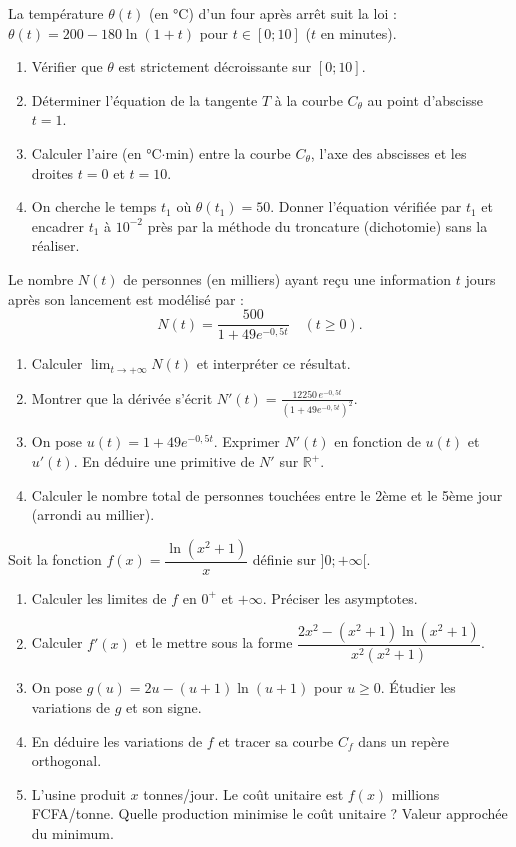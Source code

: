 \documentclass[11pt]{article}
\begin{document}
\begin{exercice}
La température $\theta(t)$ (en °C) d'un four après arrêt suit la loi : $\theta(t) = 200 - 180\ln(1+t)$ pour $t \in [0 ; 10]$ ($t$ en minutes).
\begin{enumerate}
    \item Vérifier que $\theta$ est strictement décroissante sur $[0 ; 10]$.
    \item Déterminer l'équation de la tangente $T$ à la courbe $C_\theta$ au point d'abscisse $t=1$.
    \item Calculer l'aire (en °C$\cdot$min) entre la courbe $C_\theta$, l'axe des abscisses et les droites $t=0$ et $t=10$. 
    \item On cherche le temps $t_1$ où $\theta(t_1) = 50$. Donner l'équation vérifiée par $t_1$ et encadrer $t_1$ à $10^{-2}$ près par la méthode du troncature (dichotomie) sans la réaliser.
\end{enumerate}
\end{exercice}

\begin{exercice}
Le nombre $N(t)$ de personnes (en milliers) ayant reçu une information $t$ jours après son lancement est modélisé par :
$$N(t) = \frac{500}{1 + 49e^{-0,5t}} \quad (t \geq 0).$$
\begin{enumerate}
    \item Calculer $\lim_{t\to+\infty} N(t)$ et interpréter ce résultat.
    \item Montrer que la dérivée s'écrit $N'(t) = \frac{12250\,e^{-0,5t}}{(1+49e^{-0,5t})^2}$.
    \item On pose $u(t) = 1 + 49e^{-0,5t}$. Exprimer $N'(t)$ en fonction de $u(t)$ et $u'(t)$. En déduire une primitive de $N'$ sur $\mathbb{R}^+$.
    \item Calculer le nombre total de personnes touchées entre le 2ème et le 5ème jour (arrondi au millier).
\end{enumerate}
\end{exercice}

\begin{exercice}
Soit la fonction $f(x) = \dfrac{\ln(x^2+1)}{x}$ définie sur $]0 ; +\infty[$.
\begin{enumerate}
    \item Calculer les limites de $f$ en $0^+$ et $+\infty$. Préciser les asymptotes.
    \item Calculer $f'(x)$ et le mettre sous la forme $\dfrac{2x^2 - (x^2+1)\ln(x^2+1)}{x^2(x^2+1)}$.
    \item On pose $g(u) = 2u - (u+1)\ln(u+1)$ pour $u \geq 0$. Étudier les variations de $g$ et son signe.
    \item En déduire les variations de $f$ et tracer sa courbe $C_f$ dans un repère orthogonal.
    \item L'usine produit $x$ tonnes/jour. Le coût unitaire est $f(x)$ millions FCFA/tonne. Quelle production minimise le coût unitaire ? Valeur approchée du minimum.
\end{enumerate}
\end{exercice}
\end{document}
